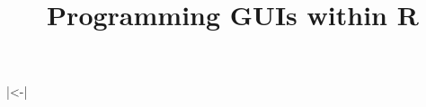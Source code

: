 \newcommand{\iprogram}[1]{\index{concepts}{Programming concepts!#1}}
\newcommand{\igui}[1]{\index{concepts}{GUI concepts!#1}}
\newcommand{\ilayout}[1]{\index{concepts}{GUI layout!#1}}


\newcommand{\tagger}[1]{\texttt{#1}}
\newcommand{\tagattr}[2]{\texttt{#1}} %

\usepackage{fancyvrb}
\DefineShortVerb{\|}
|<-|
\newcommand{\leftBracket}{$<$}
\newcommand{\rightBracket}{$>$}
\newcommand{\ASSIGN}{\code{\textless-}}  %
\newcommand{\backslashn}{\code{$\backslash$n}} %

\newcommand{\GTK}{GTK+}
\newcommand{\TCL}{Tcl}
\newcommand{\Tcl}{\TCL}
\newcommand{\TK}{Tk}
\newcommand{\Tk}{Tk}
\newcommand{\tcltk}{Tcl/Tk}
\newcommand{\Qt}{Qt}
\newcommand{\wxWidgets}{wxWidgets}
\newcommand{\Java}{Java}
\newcommand{\gWidgets}{gWidgets}

\newcommand{\TITLE}{Programming GUIs within R}
\title{\TITLE}
\newcommand{\PACKAGENAME}{ProgGUIInR}
\newcommand{\WINDOZE}{Windows}
\newcommand{\UNIX}{Unix}
\newcommand{\LINUX}{Linux}
\newcommand{\OSX}{Mac OS X}


\frenchspacing
{}


\usepackage{color}




\usepackage{fancyvrb}



